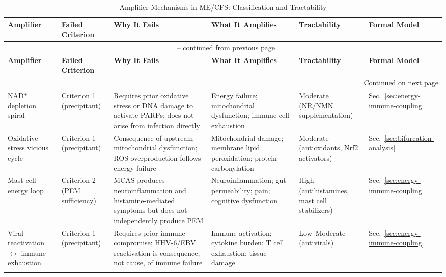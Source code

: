 \begin{landscape}
\begin{longtable}{p{3.0cm}p{2.5cm}p{4.5cm}p{3.5cm}p{2.0cm}p{2.5cm}}
\caption{Amplifier Mechanisms in ME/CFS: Classification and Tractability} \label{tab:amplifiers} \\
\toprule
\textbf{Amplifier} & \textbf{Failed Criterion} & \textbf{Why It Fails} & \textbf{What It Amplifies} & \textbf{Tractability} & \textbf{Formal Model} \\
\midrule
\endfirsthead
\multicolumn{6}{c}{\tablename\ \thetable{} -- continued from previous page} \\
\toprule
\textbf{Amplifier} & \textbf{Failed Criterion} & \textbf{Why It Fails} & \textbf{What It Amplifies} & \textbf{Tractability} & \textbf{Formal Model} \\
\midrule
\endhead
\midrule \multicolumn{6}{r}{Continued on next page} \\
\endfoot
\bottomrule
\endlastfoot

NAD$^+$ depletion spiral & Criterion 1 (precipitant) & Requires prior oxidative stress or DNA damage to activate PARPs; does not arise from infection directly & Energy failure; mitochondrial dysfunction; immune cell exhaustion & Moderate (NR/NMN supplementation) & Sec.~\ref{sec:energy-immune-coupling} \\
\addlinespace

Oxidative stress vicious cycle & Criterion 1 (precipitant) & Consequence of upstream mitochondrial dysfunction; ROS overproduction follows energy failure & Mitochondrial damage; membrane lipid peroxidation; protein carbonylation & Moderate (antioxidants, Nrf2 activators) & Sec.~\ref{sec:bifurcation-analysis} \\
\addlinespace

Mast cell--energy loop & Criterion 2 (PEM sufficiency) & MCAS produces neuroinflammation and histamine-mediated symptoms but does not independently produce PEM & Neuroinflammation; gut permeability; pain; cognitive dysfunction & High (antihistamines, mast cell stabilizers) & Sec.~\ref{sec:energy-immune-coupling} \\
\addlinespace

Viral reactivation $\leftrightarrow$ immune exhaustion & Criterion 1 (precipitant) & Requires prior immune compromise; HHV-6/EBV reactivation is consequence, not cause, of immune failure & Immune activation; cytokine burden; T cell exhaustion; tissue damage & Low--Moderate (antivirals) & Sec.~\ref{sec:energy-immune-coupling} \\
\addlinespace


\end{longtable}
\end{landscape}
